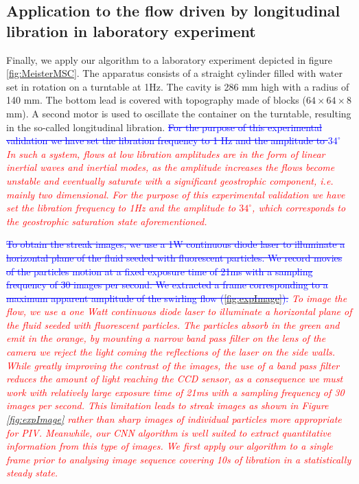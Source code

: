 \documentclass{svjour3}                     %
\newcommand{\new}[1]{\textit{\textcolor{red}{#1}}}
\newcommand{\old}[1]{\textcolor{blue}{\sout{#1}}}
\begin{document}
\subsection{Application to the flow driven by longitudinal libration in laboratory experiment}\label{experiment}
Finally, we apply our algorithm to a laboratory experiment depicted in figure \ref{fig:MeisterMSC}. The apparatus consists of a straight cylinder filled with water set in rotation on a turntable at 1Hz. The cavity is 286 mm high with a radius of 140 mm. The bottom lead is covered with topography made of blocks ($64\times 64 \times 8$ mm). A second motor is used to oscillate the container on the turntable, resulting in the so-called longitudinal libration.
\old{For the purpose of this experimental validation we have set the libration frequency to 1 Hz and the amplitude to $34^{\circ}$} \new{In such a system, flows at low libration amplitudes are in the form of linear inertial waves and inertial modes, as the amplitude increases the flows become unstable and eventually saturate with a significant geostrophic component, i.e. mainly two dimensional. For the purpose of this experimental validation we have set the libration frequency to 1Hz and the amplitude to $34^{\circ}$, which corresponds to the geostrophic saturation state aforementioned. }

\old{To obtain the streak images, we use a 1W continuous diode laser to illuminate a horizontal plane of the fluid seeded with fluorescent particles. We record movies of the particles motion at a fixed exposure time of 21ms with a sampling frequency of 30 images per second. We extracted a frame corresponding to a maximum apparent amplitude of the swirling flow (\ref{fig:expImage}).}
\new{To image the flow, we use a one Watt continuous diode laser to illuminate a horizontal plane of the fluid seeded with fluorescent particles. The particles absorb in the green and emit in the orange, by mounting a narrow band pass filter on the lens of the camera we reject the light coming the reflections of the laser on the side walls. While greatly improving the contrast of the images, the use of a band pass filter reduces the amount of light reaching the CCD sensor, as a consequence we must work with relatively large exposure time of 21ms with a sampling frequency of 30 images per second. This limitation leads to streak images as shown in Figure \ref{fig:expImage} rather than sharp images of individual particles more appropriate for PIV. Meanwhile, our CNN algorithm is well suited to extract quantitative information from this type of images. We first apply our algorithm to a single frame prior to analysing image sequence covering 10s of libration in a statistically steady state.}
\end{document}

